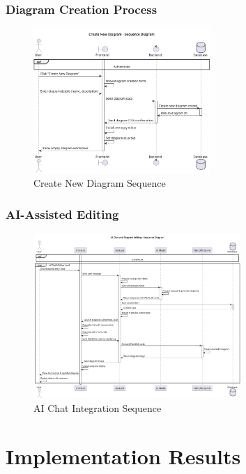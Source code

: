 \subsubsection{Diagram Creation Process}
\begin{figure}[H]
\centering
\includegraphics[width=0.6\textwidth]{conception/SprintIV/sequence_diagrams/sequence_diagramManagement_4_1_CreateNewDiagram.png}
\caption{Create New Diagram Sequence}
\end{figure}

\subsubsection{AI-Assisted Editing}
\begin{figure}[H]
\centering
\includegraphics[width=0.7\textwidth]{conception/SprintIV/sequence_diagrams/sequence_workspaceManagement_5_3_ChatWithAIMode.png}
\caption{AI Chat Integration Sequence}
\end{figure}

\section{Implementation Results}

